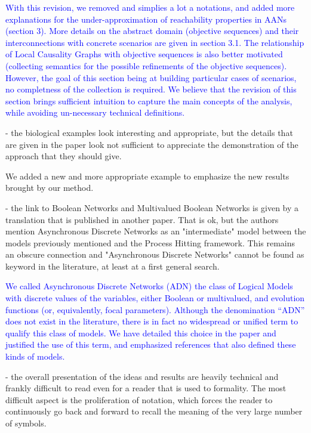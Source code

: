\documentclass[11pt]{article}
\newcommand{\answer}[1]{\textcolor{blue}{#1}\vspace*{1em}}
\begin{document}
\answer{With this revision, we removed and simplies a lot a notations, and added
more explanations for the under-approximation of reachability properties in AANs
(section 3).
More details on the abstract domain (objective sequences) and their
interconnections with concrete scenarios are given in section 3.1.
The relationship of Local Causality Graphs with objective sequences is also
better motivated (collecting semantics for the possible refinements of the
objective sequences).
However, the goal of this section being at building particular cases of
scenarios, no completness of the collection is required.
We believe that the revision of this section brings sufficient intuition to
capture the main concepts of the analysis, while avoiding un-necessary technical
definitions.
}

- the biological examples look interesting and appropriate, but the details that are given in the paper look not sufficient to appreciate the demonstration of the approach that they should give.

We added a new and more appropriate example to emphasize the new results brought by our method.

- the link to Boolean Networks and Multivalued Boolean Networks is given by a translation that is published in another paper. That is ok, but the authors mention Asynchronous Discrete Networks as an "intermediate" model between the models previously mentioned and the Process Hitting framework. This remains an obscure connection and "Asynchronous Discrete Networks" cannot be found as keyword in the literature, at least at a first general search. 

\answer{
We called Asynchronous Discrete Networks (ADN) the class of Logical Models
with discrete values of the variables,
either Boolean or multivalued,
and evolution functions (or, equivalently, focal parameters).
Although the denomination “ADN” does not exist in the literature,
there is in fact no widespread or unified term to qualify this class of models.
We have detailed this choice in the paper and justified the use of this term,
and emphasized references that also defined these kinds of models.
}

- the overall presentation of the ideas and results are heavily technical and frankly difficult to read even for a reader that is used to formality. The most difficult aspect is the proliferation of notation, which forces the reader to continuously go back and forward to recall the meaning of the very large number of symbols. 
\end{document}
